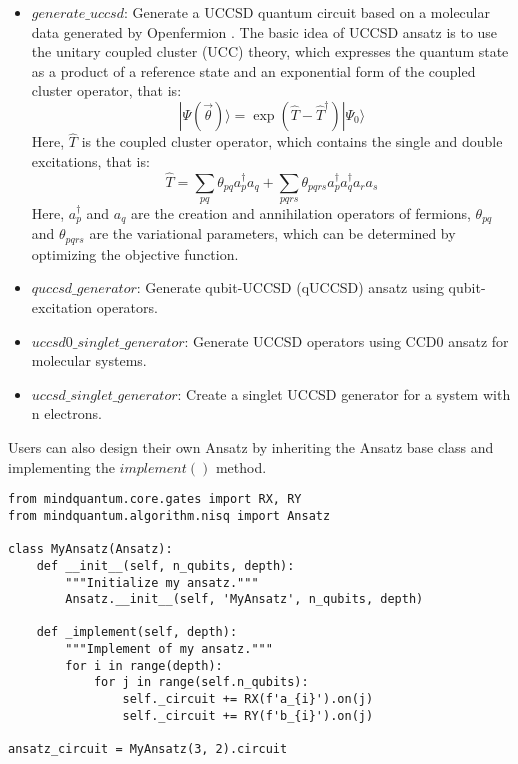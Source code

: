 \begin{itemize}
    \item $generate\_uccsd$: Generate a UCCSD quantum circuit based on a molecular data generated by Openfermion \cite{mcclean2020openfermion}. The basic idea of UCCSD ansatz is to use the unitary coupled cluster (UCC) theory, which expresses the quantum state as a product of a reference state and an exponential form of the coupled cluster operator, that is:
          $$
              |\Psi(\vec{\theta})\rangle = \exp(\hat{T} - \hat{T}^\dagger)|\Psi_0\rangle
          $$
          Here, $\hat{T}$ is the coupled cluster operator, which contains the single and double excitations, that is:
          $$
              \hat{T} = \sum_{pq}\theta_{pq}a_p^\dagger a_q + \sum_{pqrs}\theta_{pqrs}a_p^\dagger a_q^\dagger a_r a_s
          $$
          Here, $a_p^\dagger$ and $a_q$ are the creation and annihilation operators of fermions, $\theta_{pq}$ and $\theta_{pqrs}$ are the variational parameters, which can be determined by optimizing the objective function.

    \item $quccsd\_generator$: Generate qubit-UCCSD (qUCCSD) ansatz using qubit-excitation operators.
    \item $uccsd0\_singlet\_generator$: Generate UCCSD operators using CCD0 ansatz for molecular systems.
    \item $uccsd\_singlet\_generator$: Create a singlet UCCSD generator for a system with n electrons.
\end{itemize}

Users can also design their own Ansatz by inheriting the Ansatz base class and implementing the $implement()$ method.

\begin{lstlisting}
from mindquantum.core.gates import RX, RY
from mindquantum.algorithm.nisq import Ansatz

class MyAnsatz(Ansatz):
    def __init__(self, n_qubits, depth):
        """Initialize my ansatz."""
        Ansatz.__init__(self, 'MyAnsatz', n_qubits, depth)

    def _implement(self, depth):
        """Implement of my ansatz."""
        for i in range(depth):
            for j in range(self.n_qubits):
                self._circuit += RX(f'a_{i}').on(j)
                self._circuit += RY(f'b_{i}').on(j)

ansatz_circuit = MyAnsatz(3, 2).circuit
\end{lstlisting}